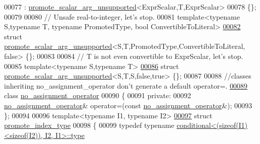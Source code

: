 \begin{DoxyCode}
00077    : \hyperlink{struct_eigen_1_1internal_1_1promote__scalar__arg__unsupported}{promote\_scalar\_arg\_unsupported}<ExprScalar,T,ExprScalar>
00078 \{\};
00079 
00080 \textcolor{comment}{// Unsafe real-to-integer, let's stop.}
00081 \textcolor{keyword}{template}<\textcolor{keyword}{typename} S,\textcolor{keyword}{typename} T, \textcolor{keyword}{typename} PromotedType, \textcolor{keywordtype}{bool} ConvertibleToLiteral>
\hyperlink{struct_eigen_1_1internal_1_1promote__scalar__arg__unsupported_3_01_s_00_01_t_00_01_promoted_type917020263f1acda837ffc1763f00e3e6}{00082} \textcolor{keyword}{struct }\hyperlink{struct_eigen_1_1internal_1_1promote__scalar__arg__unsupported}{promote\_scalar\_arg\_unsupported}<S,T,PromotedType,ConvertibleToLiteral,
      false> \{\};
00083 
00084 \textcolor{comment}{// T is not even convertible to ExprScalar, let's stop.}
00085 \textcolor{keyword}{template}<\textcolor{keyword}{typename} S,\textcolor{keyword}{typename} T>
\hyperlink{struct_eigen_1_1internal_1_1promote__scalar__arg__unsupported_3_01_s_00_01_t_00_01_s_00_01false_00_01true_01_4}{00086} \textcolor{keyword}{struct }\hyperlink{struct_eigen_1_1internal_1_1promote__scalar__arg__unsupported}{promote\_scalar\_arg\_unsupported}<S,T,S,false,true> \{\};
00087 
00088 \textcolor{comment}{//classes inheriting no\_assignment\_operator don't generate a default operator=.}
\hyperlink{class_eigen_1_1internal_1_1no__assignment__operator}{00089} \textcolor{keyword}{class }\hyperlink{class_eigen_1_1internal_1_1no__assignment__operator}{no\_assignment\_operator}
00090 \{
00091   \textcolor{keyword}{private}:
00092     \hyperlink{class_eigen_1_1internal_1_1no__assignment__operator}{no\_assignment\_operator}& operator=(\textcolor{keyword}{const} 
      \hyperlink{class_eigen_1_1internal_1_1no__assignment__operator}{no\_assignment\_operator}&);
00093 \};
00094 
00096 \textcolor{keyword}{template}<\textcolor{keyword}{typename} I1, \textcolor{keyword}{typename} I2>
\hyperlink{struct_eigen_1_1internal_1_1promote__index__type}{00097} \textcolor{keyword}{struct }\hyperlink{struct_eigen_1_1internal_1_1promote__index__type}{promote\_index\_type}
00098 \{
00099   \textcolor{keyword}{typedef} \textcolor{keyword}{typename} \hyperlink{struct_eigen_1_1internal_1_1conditional}{conditional<(sizeof(I1)<sizeof(I2)), I2, I1>::type}

\end{DoxyCode}
